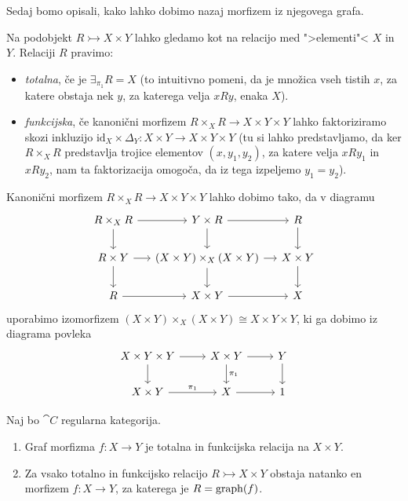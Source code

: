 \documentclass[../kategoricna_logika.tex]{subfiles}
\begin{document}
Sedaj bomo opisali, kako lahko dobimo nazaj morfizem iz njegovega
grafa.
\begin{definicija}
  Na podobjekt $R \rightarrowtail X \times Y$ lahko gledamo kot na
  relacijo med ">elementi"< $X$ in $Y$. Relaciji $R$ pravimo:
  \begin{itemize}
  \item \emph{totalna}, če je $\exists_{\pi_1}R = X$ (to intuitivno
    pomeni, da je množica vseh tistih $x$, za katere obstaja nek $y$,
    za katerega velja $xRy$, enaka $X$).
  \item \emph{funkcijska}, če kanonični morfizem
    $R \times_X R \to X \times Y \times Y$ lahko faktoriziramo skozi
    inkluzijo
    $\mathrm{id}_X \times \Delta_Y : X \times Y \to X \times Y \times
    Y$ (tu si lahko predstavljamo, da ker $R \times_X R$ predstavlja
    trojice elementov $(x, y_1, y_2)$, za katere velja $xRy_1$ in
    $xRy_2$, nam ta faktorizacija omogoča, da iz tega izpeljemo
    $y_1 = y_2$).
  \end{itemize}
\end{definicija}
\begin{opomba}
  Kanonični morfizem $R \times_X R \to X \times Y \times Y$ lahko
  dobimo tako, da v diagramu
  \begin{equation*}
    \begin{tikzcd}[row sep=normal, column sep=small]
      R \times_X R \ar[d] \ar[r] & Y \times R \ar[d] \ar[r] & R \ar[d] \\
      R \times Y \ar[d] \ar[r] & (X \times Y) \times_X (X \times Y)
      \ar[d] \ar[r] &
      X \times Y \ar[d] \\
      R \ar[r] & X \times Y \ar[r] & X
    \end{tikzcd}
  \end{equation*}
  uporabimo izomorfizem
  $(X \times Y) \times_X (X \times Y) \cong X \times Y \times Y$, ki
  ga dobimo iz diagrama povleka
  \begin{equation*}
    \begin{tikzcd}[row sep=normal, column sep=normal]
      X \times Y  \times Y\ar[d] \ar[r] & X \times Y \ar[d, "\pi_1"] \ar[r] & Y \ar[d] \\
      X \times Y \ar[r, "\pi_1"] & X \ar[r] & 1
    \end{tikzcd}
  \end{equation*}
\end{opomba}
\begin{lema}\label{lema:funkcijska-relacija-ima-graf}
  Naj bo $\cat{C}$ regularna kategorija.
  \begin{enumerate}[label=(\roman*)]
  \item Graf morfizma $f : X \to Y$ je totalna in funkcijska relacija
    na $X \times Y$.
  \item Za vsako totalno in funkcijsko relacijo
    $R \rightarrowtail X \times Y$ obstaja natanko en morfizem
    $f : X \to Y$, za katerega je $R = \operatorname{graph}(f)$.
  \end{enumerate}
\end{lema}
\end{document}
